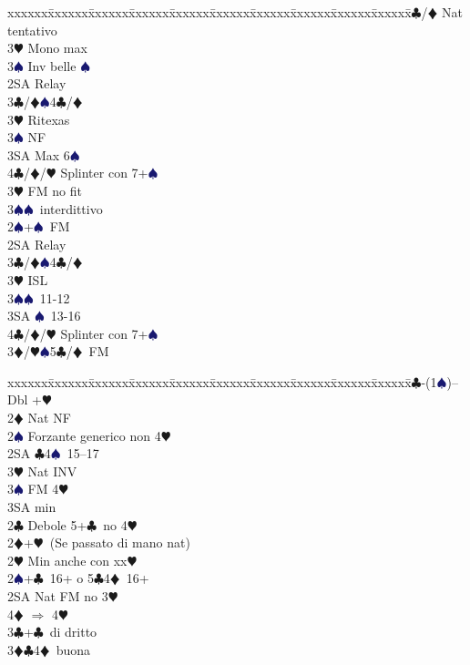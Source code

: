 \documentclass[a4paper,italian]{article}
\newcommand{\BC}{\textcolor{OliveGreen}{$\clubsuit$}}
\newcommand{\BD}{\textcolor{RedOrange}{$\vardiamondsuit$}}
\newcommand{\BH}{\textcolor{Red2}{$\varheartsuit${}}}
\newcommand{\BS}{\textcolor{MidnightBlue}{$\spadesuit${}}}
\newenvironment{bidtable}
{\begin{tabbing}

    xxxxxx\=xxxxxx\=xxxxxx\=xxxxxx\=xxxxxx\=xxxxxx\=xxxxxx\=xxxxxx\=xxxxxx\=xxxxxx\=\kill}
{\end{tabbing} }%
\begin{document}
\begin{multicols}{2}
\begin{bidtable}
        3\BC/\BD \> Nat tentativo\\
        3\BH \> Mono max\\
        3\BS \> Inv belle \BS \-\\
        2SA \> Relay\+\\
        3\BC/\BD {}\BS 4\BC /\BD \\
        3\BH \> Ritexas\+\\
        3\BS \> NF\-\\
        3SA \> Max 6\BS \\
        4\BC/\BD/\BH \> Splinter con 7+\BS \-\\
        3\BH \> FM no fit\\
        3\BS {}\BS\ interdittivo\-\\
        2\BS {}+\BS\ FM\+\\
        2SA \> Relay\+\\
        3\BC/\BD {}\BS 4\BC /\BD \\
        3\BH \> ISL\\
        3\BS {}\BS\ 11-12\\
        3SA \BS\ 13-16\\
        4\BC/\BD/\BH \> Splinter con 7+\BS \-\-\\
        3\BD/\BH {}\BS 5\BC /\BD\ FM\-
    \end{bidtable}
    \begin{bidtable}
        1\BC-(1\BS)--\+\\
        Dbl +\BH \+\\
        2\BD \> Nat NF\\
        2\BS \> Forzante generico non 4\BH \\
        2SA \BC 4\BS\ 15--17\\
        3\BH \> Nat INV\\
        3\BS \> FM 4\BH \+\\
        3SA \> min\-\-\\
        2\BC \> Debole 5+\BC\ no 4\BH \\
        2\BD {}+\BH\ (Se passato di mano nat)\+\\
        2\BH \> Min anche con xx\BH \\
        2\BS {}+\BC\ 16+ o 5\BC 4\BD\ 16+ \\
        2SA \> Nat FM no 3\BH \+\\
        4\BD \> $\Rightarrow$ 4\BH\-\\
        3\BC {}+\BC\ di dritto\\
        3\BD {}\BC 4\BD\ buona\\

\end{bidtable}
\end{multicols}
\end{document}

